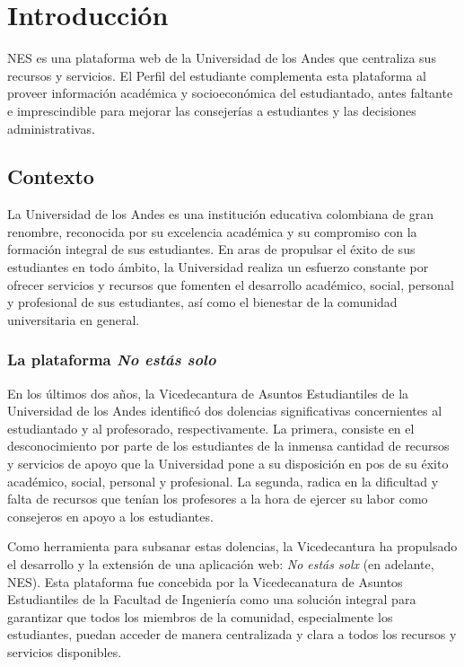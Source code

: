 \chapter{Introducción}

\begin{resumen}
  NES es una plataforma web de la Universidad de los Andes que centraliza sus recursos y servicios. El Perfil del estudiante complementa esta plataforma al proveer información académica y socioeconómica del estudiantado, antes faltante e imprescindible para mejorar las consejerías a estudiantes y las decisiones administrativas.
\end{resumen}

\section{Contexto}

La Universidad de los Andes es una institución educativa colombiana de gran renombre, reconocida por su excelencia académica y su compromiso con la formación integral de sus estudiantes. En aras de propulsar el éxito de sus estudiantes en todo ámbito, la Universidad realiza un esfuerzo constante por ofrecer servicios y recursos que fomenten el desarrollo académico, social, personal y profesional de sus estudiantes, así como el bienestar de la comunidad universitaria en general.

\subsection{La plataforma \textit{No estás solo}}

En los últimos dos años, la Vicedecantura de Asuntos Estudiantiles de la Universidad de los Andes identificó dos dolencias significativas concernientes al estudiantado y al profesorado, respectivamente. La primera, consiste en el desconocimiento por parte de los estudiantes de la inmensa cantidad de recursos y servicios de apoyo que la Universidad pone a su disposición en pos de su éxito académico, social, personal y profesional. La segunda, radica en la dificultad y falta de recursos que tenían los profesores a la hora de ejercer su labor como consejeros en apoyo a los estudiantes.

Como herramienta para subsanar estas dolencias, la Vicedecantura ha propulsado el desarrollo y la extensión de una aplicación web: \textit{No estás solx} (en adelante, NES). Esta plataforma fue concebida por la Vicedecanatura de Asuntos Estudiantiles de la Facultad de Ingeniería como una solución integral para garantizar que todos los miembros de la comunidad, especialmente los estudiantes, puedan acceder de manera centralizada y clara a todos los recursos y servicios disponibles.


